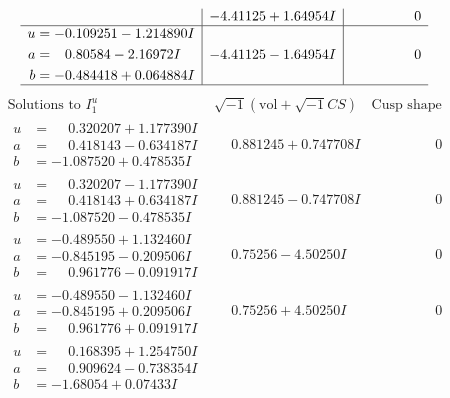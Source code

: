 \documentclass[1p]{elsarticle_modified}
\theoremstyle{definition}
\newcommand{\I}{\sqrt{-1}}
\begin{document}
$$\begin{array}{c|c|c}
 & -4.41125 + 1.64954 I & \phantom{-0.000000 } 0 \\ \hline\begin{aligned}
u &= -0.109251 - 1.214890 I \\
a &= \phantom{-}0.80584 - 2.16972 I \\
b &= -0.484418 + 0.064884 I\end{aligned}
 & -4.41125 - 1.64954 I & \phantom{-0.000000 } 0\\
 \hline 
 \end{array}$$\newpage$$\begin{array}{c|c|c}  
\text{Solutions to }I^u_{1}& \I (\text{vol} + \sqrt{-1}CS) & \text{Cusp shape}\\
 \hline 
\begin{aligned}
u &= \phantom{-}0.320207 + 1.177390 I \\
a &= \phantom{-}0.418143 - 0.634187 I \\
b &= -1.087520 + 0.478535 I\end{aligned}
 & \phantom{-}0.881245 + 0.747708 I & \phantom{-0.000000 } 0 \\ \hline\begin{aligned}
u &= \phantom{-}0.320207 - 1.177390 I \\
a &= \phantom{-}0.418143 + 0.634187 I \\
b &= -1.087520 - 0.478535 I\end{aligned}
 & \phantom{-}0.881245 - 0.747708 I & \phantom{-0.000000 } 0 \\ \hline\begin{aligned}
u &= -0.489550 + 1.132460 I \\
a &= -0.845195 - 0.209506 I \\
b &= \phantom{-}0.961776 - 0.091917 I\end{aligned}
 & \phantom{-}0.75256 - 4.50250 I & \phantom{-0.000000 } 0 \\ \hline\begin{aligned}
u &= -0.489550 - 1.132460 I \\
a &= -0.845195 + 0.209506 I \\
b &= \phantom{-}0.961776 + 0.091917 I\end{aligned}
 & \phantom{-}0.75256 + 4.50250 I & \phantom{-0.000000 } 0 \\ \hline\begin{aligned}
u &= \phantom{-}0.168395 + 1.254750 I \\
a &= \phantom{-}0.909624 - 0.738354 I \\
b &= -1.68054 + 0.07433 I\end{aligned}

\end{array}$$
\end{document}
